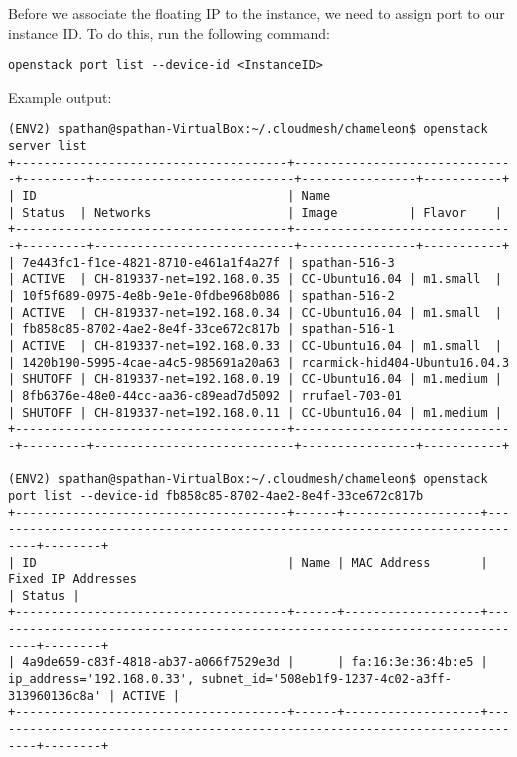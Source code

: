 Before we associate the floating IP to the instance, we need to assign
port to our instance ID. To do this, run the following command:

\texttt{openstack\ port\ list\ -\/-device-id\ \textless{}InstanceID\textgreater{}}

Example output:

\begin{lstlisting}
(ENV2) spathan@spathan-VirtualBox:~/.cloudmesh/chameleon$ openstack server list
+--------------------------------------+-------------------------------+---------+----------------------------+----------------+-----------+
| ID                                   | Name                          | Status  | Networks                   | Image          | Flavor    |
+--------------------------------------+-------------------------------+---------+----------------------------+----------------+-----------+
| 7e443fc1-f1ce-4821-8710-e461a1f4a27f | spathan-516-3                 | ACTIVE  | CH-819337-net=192.168.0.35 | CC-Ubuntu16.04 | m1.small  |
| 10f5f689-0975-4e8b-9e1e-0fdbe968b086 | spathan-516-2                 | ACTIVE  | CH-819337-net=192.168.0.34 | CC-Ubuntu16.04 | m1.small  |
| fb858c85-8702-4ae2-8e4f-33ce672c817b | spathan-516-1                 | ACTIVE  | CH-819337-net=192.168.0.33 | CC-Ubuntu16.04 | m1.small  |
| 1420b190-5995-4cae-a4c5-985691a20a63 | rcarmick-hid404-Ubuntu16.04.3 | SHUTOFF | CH-819337-net=192.168.0.19 | CC-Ubuntu16.04 | m1.medium |
| 8fb6376e-48e0-44cc-aa36-c89ead7d5092 | rrufael-703-01                | SHUTOFF | CH-819337-net=192.168.0.11 | CC-Ubuntu16.04 | m1.medium |
+--------------------------------------+-------------------------------+---------+----------------------------+----------------+-----------+

(ENV2) spathan@spathan-VirtualBox:~/.cloudmesh/chameleon$ openstack port list --device-id fb858c85-8702-4ae2-8e4f-33ce672c817b
+--------------------------------------+------+-------------------+-----------------------------------------------------------------------------+--------+
| ID                                   | Name | MAC Address       | Fixed IP Addresses                                                          | Status |
+--------------------------------------+------+-------------------+-----------------------------------------------------------------------------+--------+
| 4a9de659-c83f-4818-ab37-a066f7529e3d |      | fa:16:3e:36:4b:e5 | ip_address='192.168.0.33', subnet_id='508eb1f9-1237-4c02-a3ff-313960136c8a' | ACTIVE |
+--------------------------------------+------+-------------------+-----------------------------------------------------------------------------+--------+
\end{lstlisting}


